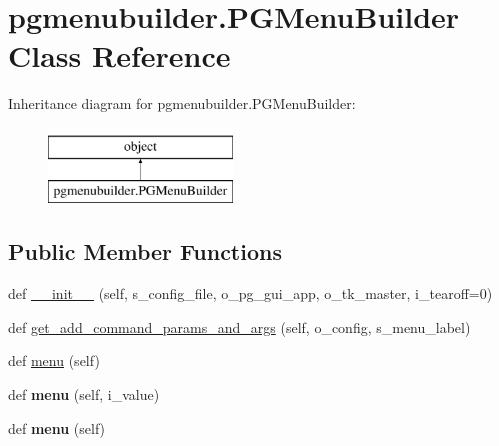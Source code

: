 \hypertarget{classpgmenubuilder_1_1PGMenuBuilder}{}\section{pgmenubuilder.\+P\+G\+Menu\+Builder Class Reference}
\label{classpgmenubuilder_1_1PGMenuBuilder}
Inheritance diagram for pgmenubuilder.\+P\+G\+Menu\+Builder\+:\begin{figure}[H]
\begin{center}
\leavevmode
\includegraphics[height=2.000000cm]{classpgmenubuilder_1_1PGMenuBuilder}
\end{center}
\end{figure}
\subsection*{Public Member Functions}
\begin{DoxyCompactItemize}
\item 
def \hyperlink{classpgmenubuilder_1_1PGMenuBuilder_afc8654886790ae5046fb9e8e476a26f9}{\+\_\+\+\_\+init\+\_\+\+\_\+} (self, s\+\_\+config\+\_\+file, o\+\_\+pg\+\_\+gui\+\_\+app, o\+\_\+tk\+\_\+master, i\+\_\+tearoff=0)
\item 
def \hyperlink{classpgmenubuilder_1_1PGMenuBuilder_af793740cfaa34421c8ebcc338e5bc3e2}{get\+\_\+add\+\_\+command\+\_\+params\+\_\+and\+\_\+args} (self, o\+\_\+config, s\+\_\+menu\+\_\+label)
\item 
def \hyperlink{classpgmenubuilder_1_1PGMenuBuilder_aa7ebe861ec4eb5e55eb16d3f4d754d5e}{menu} (self)
\item 
def {\bfseries menu} (self, i\+\_\+value)\hypertarget{classpgmenubuilder_1_1PGMenuBuilder_ab7fe46f02e0eec61429221ffcc53f956}{}\label{classpgmenubuilder_1_1PGMenuBuilder_ab7fe46f02e0eec61429221ffcc53f956}

\item 
def {\bfseries menu} (self)\hypertarget{classpgmenubuilder_1_1PGMenuBuilder_aa7ebe861ec4eb5e55eb16d3f4d754d5e}{}\label{classpgmenubuilder_1_1PGMenuBuilder_aa7ebe861ec4eb5e55eb16d3f4d754d5e}

\end{DoxyCompactItemize}
